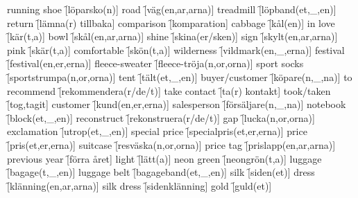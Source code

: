 \begin{questions}
\begin{multicols}{2}
        \question running shoe \f[löparsko(n)]
        \question road \f[väg(en,ar,arna)]
        \question treadmill \f[löpband(et,\_,en)]
        \question return \f[lämna(r) tillbaka]
        \question comparison \f[komparation]
        \question cabbage \f[kål(en)]
        \question in love \f[kär(t,a)]
        \question bowl \f[skål(en,ar,arna)]
        \question shine \f[skina(er/sken)]
        \question sign \f[skylt(en,ar,arna)]
        \question pink \f[skär(t,a)]
        \question comfortable \f[skön(t,a)]
        \question wilderness \f[vildmark(en,\_,erna)]
        \question festival \f[festival(en,er,erna)]
        \question fleece-sweater \f[fleece-tröja(n,or,orna)]
        \question sport socks \f[sportstrumpa(n,or,orna)]
        \question tent \f[tält(et,\_,en)]
        \question buyer/customer \f[köpare(n,\_,na)]
        \question to recommend \f[rekommendera(r/de/t)]
        \question take contact \f[ta(r) kontakt]
        \question took/taken \f[tog,tagit]
        \question customer \f[kund(en,er,erna)]
        \question salesperson \f[försäljare(n,\_,na)]
        \question notebook \f[block(et,\_,en)]
        \question reconstruct \f[rekonstruera(r/de/t)]
        \question gap \f[lucka(n,or,orna)]
        \question exclamation \f[utrop(et,\_,en)]
        \question special price \f[specialpris(et,er,erna)]
        \question price \f[pris(et,er,erna)]
        \question suitcase \f[resväska(n,or,orna)]
        \question price tag \f[prislapp(en,ar,arna)]
        \question previous year \f[förra året]
        \question light \f[lätt(a)]
        \question neon green \f[neongrön(t,a)]
        \question luggage \f[bagage(t,\_,en)]
        \question luggage belt \f[bagageband(et,\_,en)]
        \question silk \f[siden(et)]
        \question dress \f[klänning(en,ar,arna)]
        \question silk dress \f[sidenklänning]
        \question gold \f[guld(et)]
    \end{multicols}
\end{questions}

